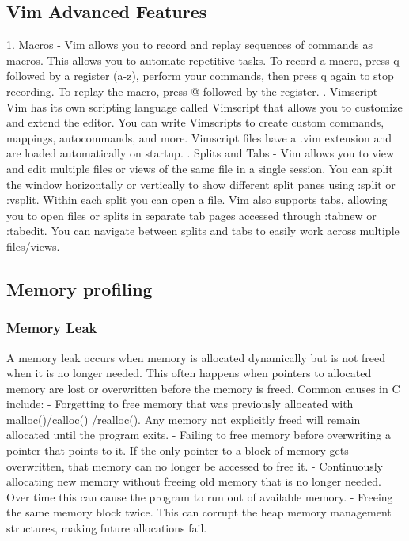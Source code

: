 \documentclass [ titlepage ]{article}
\begin{document}
\subsection{ Vim Advanced Features}
1. Macros - Vim allows you to record and replay sequences of commands as macros. This allows you to automate repetitive tasks. To record a
 macro, press q followed by a register (a-z), perform your commands, then press q again to stop recording. To replay the macro, press @
 followed by the register. \newline {}. Vimscript - Vim has its own scripting language called Vimscript that allows you to customize and extend the editor. You can write Vimscripts
 to create custom commands, mappings, autocommands, and more. Vimscript files have a .vim extension and are loaded automatically on
 startup. \newline {}. Splits and Tabs - Vim allows you to view and edit multiple files or views of the same file in a single session. You can split the window
 horizontally or vertically to show different split panes using :split or :vsplit. Within each split you can open a file. Vim also supports tabs,
 allowing you to open files or splits in separate tab pages accessed through :tabnew or :tabedit. You can navigate between splits and tabs to
 easily work across multiple files/views.

\subsection{Memory profiling}
\subsubsection{Memory Leak}
A memory leak occurs when memory is allocated dynamically but is not freed when it is no longer needed. This often happens when pointers
 to allocated memory are lost or overwritten before the memory is freed. Common causes in C include: \newline
- Forgetting to free memory that was previously allocated with malloc()/calloc()  /realloc(). Any memory not explicitly freed will remain
 allocated until the program exits. \newline
- Failing to free memory before overwriting a pointer that points to it. If the only pointer to a block of memory gets overwritten, that memory
 can no longer be accessed to free it. \newline
- Continuously allocating new memory without freeing old memory that is no longer needed. Over time this can cause the program to run out
 of available memory. \newline
- Freeing the same memory block twice. This can corrupt the heap memory management structures, making future allocations fail. \newline
\end{document}
